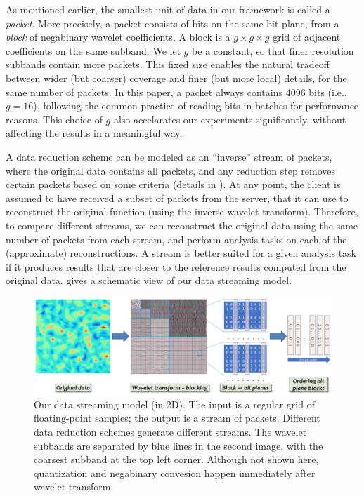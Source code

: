As mentioned earlier, the smallest unit of data in our framework is called a
\emph{packet}.  More precisely, a packet consists of bits on the same bit
plane, from a \emph{block} of negabinary wavelet coefficients. A block is a
$g\times g\times g$ grid of adjacent coefficients on the same subband. We let
$g$ be a constant, so that finer resolution subbands contain more packets. This fixed size
enables the natural tradeoff between wider (but coarser) coverage and finer
(but more local) details, for the same number of packets. In this paper, a
packet always contains $4096$ bits (i.e., $g=16$), following the common
practice of reading bits in batches for performance reasons. This choice of $g$
also accelarates our experiments significantly, without affecting the results
in a meaningful way. 

A data reduction scheme can be modeled as an ``inverse'' stream of packets,
where the original data contains all packets, and any reduction step removes
certain packets based on some criteria (details in
).    At any point, the client is assumed to have received a subset of
packets from the server, that it can use to reconstruct the original function
(using the inverse wavelet transform). Therefore, to compare different streams,
we can reconstruct the original data using the same number of packets from
each stream, and perform analysis tasks on each of the (approximate) reconstructions.
A stream is better suited for a given analysis task if it produces results that
are closer to  the reference results
computed from the original data.  gives a schematic view of
our data streaming model.

\begin{figure}[h]
\centering
\includegraphics[width=\linewidth]{img/pipeline.png}
\caption{Our data streaming model (in 2D). The input is a regular grid of
floating-point samples; the output is a stream of packets. Different data
reduction schemes generate different streams.  The wavelet subbands are
separated by blue lines in the second image, with the coarsest subband at the
top left corner. Although not shown here, quantization and negabinary
convesion happen immediately after wavelet transform. }\label{fig:pipeline}
\end{figure}

